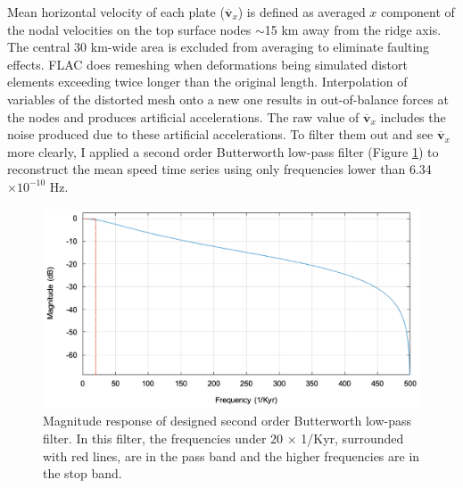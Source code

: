\documentclass[letterpaper,12pt,notitle]{memphisthesis}                     %
\begin{document}
Mean horizontal velocity of each plate ($\overline{\boldsymbol{v}}_{x}$) is defined as averaged $x$ component of the nodal velocities on the top surface nodes $\sim$15 km away from the ridge axis. The central 30 km-wide area is excluded from averaging to eliminate faulting effects. 
FLAC does remeshing \citep{Lavier2002} when deformations being simulated distort elements exceeding twice longer than the original length. Interpolation of variables of the distorted mesh onto a new one results in out-of-balance forces at the nodes and produces artificial accelerations. The raw value of $\overline{\boldsymbol{v}}_{x}$ includes the noise produced due to these artificial accelerations. To filter them out and see $\overline{\boldsymbol{v}}_{x}$ more clearly, I applied a second order Butterworth low-pass filter (Figure \ref{fig:filter}) to reconstruct the mean speed time series using only frequencies lower than 6.34 $\times 10^{-10}$ Hz.
%
\begin{figure}[!htb]
	\centering
	\includegraphics[width=0.8\linewidth,trim=4 4 4 4,clip]{./figs/filter.png}
	\caption{Magnitude response of designed second order Butterworth low-pass filter. In this filter, the frequencies under 20 $\times$ 1/Kyr, surrounded with red lines, are in the pass band and the higher frequencies are in the stop band.}
	\label{fig:filter}
\end{figure}
\end{document}
